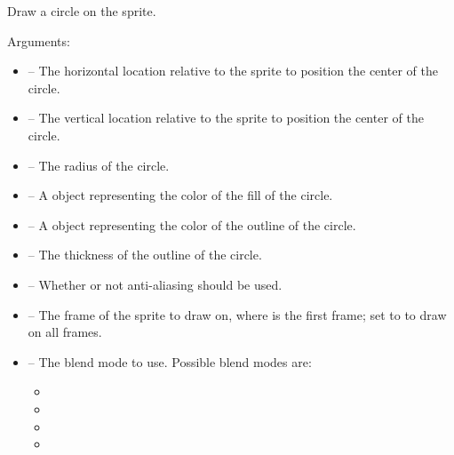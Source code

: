 \documentclass[letterpaper,10pt,english]{sphinxmanual}
\begin{document}
\begin{fulllineitems}
\label{gfx:sge.gfx.Sprite.draw_circle}
Draw a circle on the sprite.

Arguments:
\begin{itemize}
\item {} 
 -- The horizontal location relative to the sprite to
position the center of the circle.

\item {} 
 -- The vertical location relative to the sprite to
position the center of the circle.

\item {} 
 -- The radius of the circle.

\item {} 
 -- A {\hyperref[gfx:sge.gfx.Color]{\emph{}}} object representing the
color of the fill of the circle.

\item {} 
 -- A {\hyperref[gfx:sge.gfx.Color]{\emph{}}} object representing
the color of the outline of the circle.

\item {} 
 -- The thickness of the outline of the
circle.

\item {} 
 -- Whether or not anti-aliasing should be used.

\item {} 
 -- The frame of the sprite to draw on, where 
is the first frame; set to  to draw on all
frames.

\item {} 
 -- The blend mode to use.  Possible blend modes
are:
\begin{itemize}
\item {} 

\item {} 

\item {} 

\item {} 


\end{itemize}
\end{itemize}
\end{fulllineitems}
\end{document}

